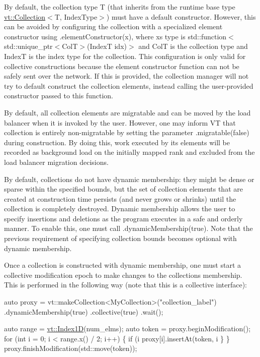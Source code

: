By default, the collection type {\ttfamily T} (that inherits from the runtime base type {\ttfamily \hyperlink{namespacevt_ac72e048964e4bb536faaa8bc90f58db7}{vt\+::\+Collection}$<$T, Index\+Type$>$}) must have a default constructor. However, this can be avoided by configuring the collection with a specialized element constructor using {\ttfamily .element\+Constructor(x)}, where {\ttfamily x}\textquotesingle{}s type is {\ttfamily std\+::function$<$std\+::unique\+\_\+ptr$<$ColT$>$(IndexT idx)$>$} and {\ttfamily ColT} is the collection type and {\ttfamily IndexT} is the index type for the collection. This configuration is only valid for collective constructions because the element constructor function can not be safely sent over the network. If this is provided, the collection manager will not try to default construct the collection elements, instead calling the user-\/provided constructor passed to this function.

By default, all collection elements are migratable and can be moved by the load balancer when it is invoked by the user. However, one may inform VT that collection is entirely non-\/migratable by setting the parameter {\ttfamily .migratable(false)} during construction. By doing this, work executed by its elements will be recorded as background load on the initially mapped rank and excluded from the load balancer migration decisions.

By default, collections do not have dynamic membership\+: they might be dense or sparse within the specified bounds, but the set of collection elements that are created at construction time persists (and never grows or shrinks) until the collection is completely destroyed. Dynamic membership allows the user to specify insertions and deletions as the program executes in a safe and orderly manner. To enable this, one must call {\ttfamily .dynamic\+Membership(true)}. Note that the previous requirement of specifying collection bounds becomes optional with dynamic membership.

Once a collection is constructed with dynamic membership, one must start a collective modification epoch to make changes to the collection\textquotesingle{}s membership. This is performed in the following way (note that this is a collective interface)\+:


\begin{DoxyCode}
\textcolor{keyword}{auto} proxy = vt::makeCollection<MyCollection>(\textcolor{stringliteral}{"collection\_label"})
  .dynamicMembership(\textcolor{keyword}{true})
  .collective(\textcolor{keyword}{true})
  .wait();

\textcolor{keyword}{auto} range = \hyperlink{namespacevt_a5540efc78234273e1796fb003fe4d234}{vt::Index1D}(num\_elms);
\textcolor{keyword}{auto} token = proxy.beginModification();
\textcolor{keywordflow}{for} (\textcolor{keywordtype}{int} i = 0; i < range.x() / 2; i++) \{
  \textcolor{keywordflow}{if} (i %
    proxy[i].insertAt(token, i %
  \}
\}
proxy.finishModification(std::move(token));
\end{DoxyCode}


